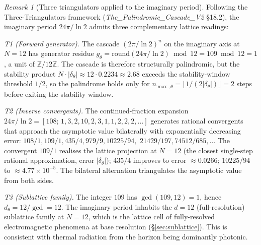 \documentclass[11pt,a4paper]{article}
\theoremstyle{definition}
\theoremstyle{remark}
\newtheorem{remark}[theorem]{Remark}
\begin{document}
\begin{remark}[Three triangulators applied to the imaginary period]\label{rem:U1-triangulation}
Following the Three-Triangulators framework (\textit{The\_\allowbreak Palindromic\_\allowbreak Cascade\_\allowbreak V2} \S18.2), the imaginary period $24\pi/\ln 2$ admits three complementary lattice readings:

\emph{T1 (Forward generator).} The cascade $(2\pi/\ln 2)^{n}$ on the imaginary axis at $N=12$ has generator residue $g_{\theta} = \mathrm{round}(24\pi/\ln 2) \bmod 12 = 109 \bmod 12 = 1$, a unit of $\mathbb{Z}/12\mathbb{Z}$. The cascade is therefore structurally palindromic, but the stability product $N\cdot |\delta_{\theta}| \approx 12 \cdot 0.2234 \approx 2.68$ exceeds the stability-window threshold $1/2$, so the palindrome holds only for $n_{\max,\theta} = \lfloor 1/(2|\delta_{\theta}|)\rfloor = 2$ steps before exiting the stability window.

\begin{sloppypar}
\emph{T2 (Inverse convergents).} The continued-fraction expansion $24\pi/\ln 2 = [108;\,1,3,2,10,2,3,1,1,2,2,2,\ldots]$\allowbreak{} generates rational convergents that approach the asymptotic value bilaterally with exponentially decreasing error: $108/1, 109/1, 435/4, 979/9, 10225/94,$\allowbreak{} $21429/197, 74512/685,\ldots$\allowbreak{} The convergent $109/1$ realises the lattice projection at $N=12$ (the closest single-step rational approximation, error $|\delta_{\theta}|$); $435/4$ improves to error $\approx 0.0266$; $10225/94$ to $\approx 4.77\times 10^{-5}$. The bilateral alternation triangulates the asymptotic value from both sides.
\end{sloppypar}

\emph{T3 (Sublattice family).} The integer $109$ has $\gcd(109,12) = 1$, hence $d_{\theta} = 12/\gcd = 12$. The imaginary period inhabits the $d=12$ (full-resolution) sublattice family at $N=12$, which is the lattice cell of fully-resolved electromagnetic phenomena at base resolution (\S\ref{sec:sublattice}). This is consistent with thermal radiation from the horizon being dominantly photonic.
\end{remark}
\end{document}
